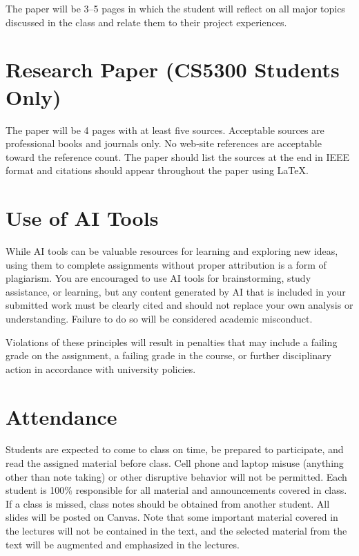 \documentclass[11pt]{article}
\begin{document}
The paper will be 3--5 pages in which the student will reflect on all major topics discussed in the class and relate them to their project experiences.

\section*{Research Paper (CS5300 Students Only)}

The paper will be 4 pages with at least five sources. Acceptable sources are professional books and journals only. No web-site references are acceptable toward the reference count. The paper should list the sources at the end in IEEE format and citations should appear throughout the paper using \LaTeX.

\section*{Use of AI Tools}

While AI tools can be valuable resources for learning and exploring new ideas, using them to complete assignments without proper attribution is a form of plagiarism. You are encouraged to use AI tools for brainstorming, study assistance, or learning, but any content generated by AI that is included in your submitted work must be clearly cited and should not replace your own analysis or understanding. Failure to do so will be considered academic misconduct.

Violations of these principles will result in penalties that may include a failing grade on the assignment, a failing grade in the course, or further disciplinary action in accordance with university policies.

\section*{Attendance}

Students are expected to come to class on time, be prepared to participate, and read the assigned material before class. Cell phone and laptop misuse (anything other than note taking) or other disruptive behavior will not be permitted. Each student is 100\% responsible for all material and announcements covered in class. If a class is missed, class notes should be obtained from another student. All slides will be posted on Canvas. Note that some important material covered in the lectures will not be contained in the text, and the selected material from the text will be augmented and emphasized in the lectures.
\end{document}
